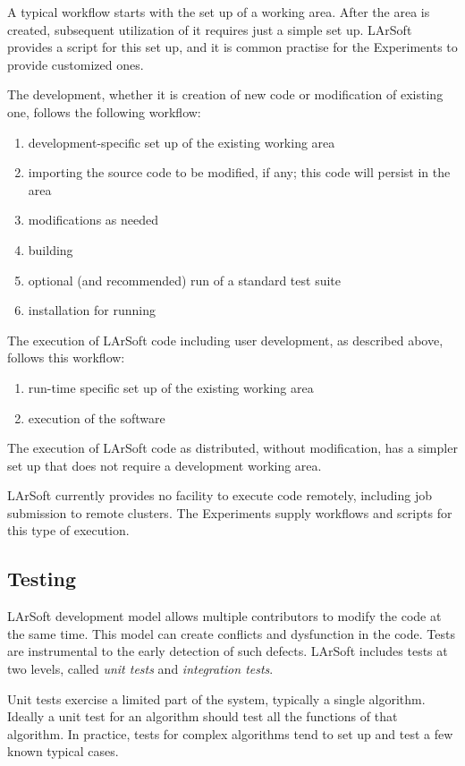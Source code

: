 A typical workflow starts with the set up of a working area.
After the area is created, subsequent utilization of it requires just a simple set up.
LArSoft provides a script for this set up,
and it is common practise for the Experiments to provide customized ones.

The development, whether it is creation of new code or modification of existing one,
follows the following workflow:
\begin{enumerate}
   \item development-specific set up of the existing working area
   \item importing the source code to be modified, if any; this code will persist in the area
   \item modifications as needed
   \item building
   \item optional (and recommended) run of a standard test suite
   \item installation for running
\end{enumerate}

The execution of LArSoft code including user development, as described above,
follows this workflow:
\begin{enumerate}
   \item run-time specific set up of the existing working area
   \item execution of the software
\end{enumerate}
The execution of LArSoft code as distributed, without modification,
has a simpler set up that does not require a development working area.

LArSoft currently provides no facility to execute code remotely,
including job submission to remote clusters.
The Experiments supply workflows and scripts for this type of execution.



\subsection{Testing}
\label{ssec:Development:testing}

LArSoft development model allows multiple contributors to modify the
code at the same time. This model can create conflicts and dysfunction
in the code. Tests are instrumental to the early detection of such
defects. LArSoft includes tests at two levels, called \emph{unit tests}
and \emph{integration tests}.

Unit tests exercise a limited part of the system, typically a single
algorithm. Ideally a unit test for an algorithm should test all the
functions of that algorithm. In practice, tests for complex algorithms
tend to set up and test a few known typical cases.

